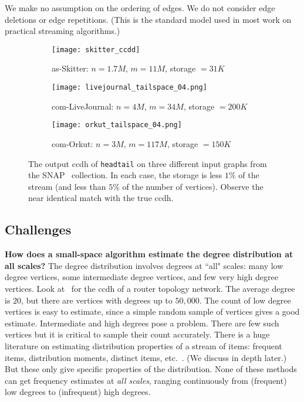 \documentclass[11pt]{article}
\theoremstyle{definition}
\newcommand{\degdist}{{\tt headtail}}
\begin{document}
We make no assumption on the ordering of edges.
We do not consider edge deletions or edge repetitions. (This is the standard
model used in most work on practical streaming algorithms.)



\begin{figure*}[t]
    \centering
    \begin{subfigure}[b]{0.3\textwidth}
        \centering \texttt{[image: skitter\_ccdd]}
        \caption{as-Skitter: $n = 1.7M$, $m = 11M$, storage $=31K$}
        \label{fig:skitter-ccdh}
    \end{subfigure}
    \hfill
    \begin{subfigure}[b]{0.3\textwidth}
        \centering \texttt{[image: livejournal\_tailspace\_04.png]}
        \caption{com-LiveJournal: $n = 4M$, $m = 34M$, storage $=200K$}
        \label{fig:livejournal_tailspace_04}
        \end{subfigure}
    \hfill
    \begin{subfigure}[b]{0.3\textwidth}
        \centering \texttt{[image: orkut\_tailspace\_04.png]}
        \caption{com-Orkut: $n = 3M$, $m = 117M$, storage $=150K$}
        \label{fig:orkut_tailspace_04}
    \end{subfigure}
    \caption{The output ccdh of \degdist{} on three different input graphs from
the SNAP~\cite{snap} collection. In each case, the storage is less $1\%$ of the stream
    (and less than $5\%$ of the number of vertices). Observe the near identical match
    with the true ccdh.}
    \label{fig:ccdh}
\end{figure*}

\subsection{Challenges}

\textbf{How does a small-space algorithm estimate the degree distribution at all scales?}
 The degree distribution involves degrees at ``all" scales:
many low degree vertices, some intermediate degree vertices, and few very high degree vertices.
Look at~ for the ccdh of a router topology network. The average degree is $20$,
but there are vertices with degrees up to $50,000$.
The count of low degree vertices is easy to estimate, since a simple random sample of vertices gives a good estimate.
Intermediate and high degrees pose a problem. There are few such vertices but it is critical to sample
their count accurately. There is a huge literature on estimating distribution properties
of a stream of items: frequent items, distribution moments, distinct items, etc.~\cite{IndykW05,KaneNW10,cormode2008frequent}.
(We discuss in depth later.) But these only give specific properties of the distribution. None of these methods can get frequency estimates at \emph{all scales}, ranging continuously from (frequent)
low degrees to (infrequent) high degrees.
\end{document}
